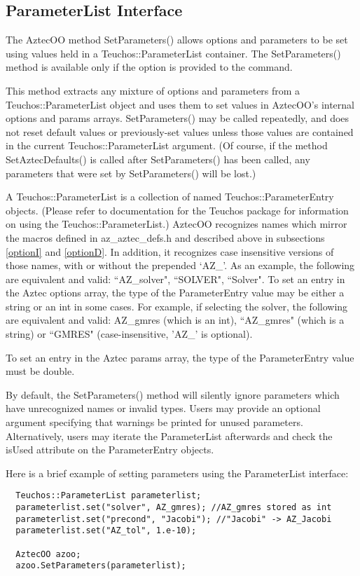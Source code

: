 \documentclass[12pt,relax]{AztecOOUserGuide}
\begin{document}
\subsection{ParameterList Interface\label{parameterlist}}
The AztecOO method SetParameters() allows options and parameters to be set
using values held in a Teuchos::ParameterList container. The SetParameters()
method is available only if the option 
is provided to the  command.

This method extracts any mixture of options and parameters from a
Teuchos::\-Para\-meterList object and uses them to set values in AztecOO's
internal
options and params arrays. SetParameters() may be called repeatedly, and does
not reset default values or previously-set values unless those values are
contained in the current Teuchos::ParameterList argument. (Of course, if the
method SetAztecDefaults() is called after SetParameters() has been called,
any parameters that were set by SetParameters() will be lost.)

A Teuchos::ParameterList is a collection of named Teuchos::ParameterEntry
objects. (Please refer to documentation for the Teuchos package for information
on using the Teuchos::ParameterList.) AztecOO recognizes names which mirror the
macros defined in az\_aztec\_defs.h and described above in subsections
\ref{optionI} and \ref{optionD}.
In addition, it recognizes case insensitive versions of those names, with or
without the prepended `AZ\_'. As an example, the following are equivalent and
valid: ``AZ\_solver", ``SOLVER", ``Solver". To set an entry in the Aztec options
array, the type of the ParameterEntry value may be either a string or an int
in some cases. For example, if selecting the solver, the following are equivalent
and valid: AZ\_gmres (which is an int), ``AZ\_gmres" (which is a string) or
``GMRES" (case-insensitive, 'AZ\_' is optional).

To set an entry in the Aztec params array, the type of the
ParameterEntry value must be double.

By default, the SetParameters() method will silently ignore parameters which have
unrecognized names or invalid types. Users may provide an optional argument
specifying that warnings be printed for unused parameters. Alternatively,
users may iterate the ParameterList afterwards and check the isUsed
attribute on the ParameterEntry objects.

Here is a brief example of setting parameters using the ParameterList interface:
\begin{verbatim}
  Teuchos::ParameterList parameterlist;
  parameterlist.set("solver", AZ_gmres); //AZ_gmres stored as int
  parameterlist.set("precond", "Jacobi"); //"Jacobi" -> AZ_Jacobi
  parameterlist.set("AZ_tol", 1.e-10);

  AztecOO azoo;
  azoo.SetParameters(parameterlist);
\end{verbatim}
\end{document}
